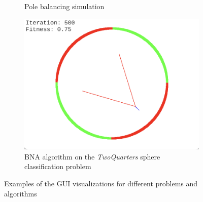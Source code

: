 \begin{figure}
\begin{subfigure}{0.5\textwidth}
        \caption{Pole balancing simulation}
    \end{subfigure}%
    \hfill
    \begin{subfigure}{0.5\textwidth}
        \centering
        \includegraphics[width=0.8\linewidth]{Pictures/bna_gui}
        \caption{BNA algorithm on the \textit{TwoQuarters} sphere classification problem}
    \end{subfigure}%
    \caption{Examples of the GUI visualizations for different problems and algorithms}
    \label{fig:gui_screenshots}
\end{figure}
